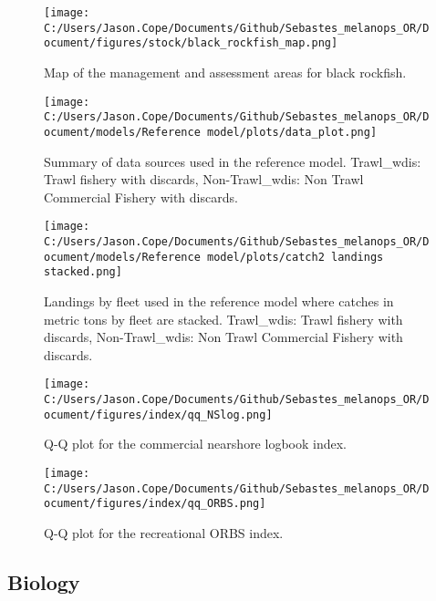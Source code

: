 \documentclass[11pt,
  english,
  letterpaper,
]{article}
\begin{document}
\begin{figure}
\centering
\texttt{[image: C:/Users/Jason.Cope/Documents/Github/Sebastes\_melanops\_OR/Document/figures/stock/black\_rockfish\_map.png]}
\caption{Map of the management and assessment areas for black rockfish.\label{fig:map}}
\end{figure}

\newpage

\begin{figure}
\centering
\texttt{[image: C:/Users/Jason.Cope/Documents/Github/Sebastes\_melanops\_OR/Document/models/Reference model/plots/data\_plot.png]}
\caption{Summary of data sources used in the reference model. Trawl\_wdis: Trawl fishery with discards, Non-Trawl\_wdis: Non Trawl Commercial Fishery with discards.\label{fig:data-plot}}
\end{figure}

\newpage

\begin{figure}
\centering
\texttt{[image: C:/Users/Jason.Cope/Documents/Github/Sebastes\_melanops\_OR/Document/models/Reference model/plots/catch2 landings stacked.png]}
\caption{Landings by fleet used in the reference model where catches in metric tons by fleet are stacked. Trawl\_wdis: Trawl fishery with discards, Non-Trawl\_wdis: Non Trawl Commercial Fishery with discards.\label{fig:catch}}
\end{figure}

\newpage

\begin{figure}
\centering
\texttt{[image: C:/Users/Jason.Cope/Documents/Github/Sebastes\_melanops\_OR/Document/figures/index/qq\_NSlog.png]}
\caption{Q-Q plot for the commercial nearshore logbook index.\label{fig:qq_NSlog}}
\end{figure}

\newpage

\begin{figure}
\centering
\texttt{[image: C:/Users/Jason.Cope/Documents/Github/Sebastes\_melanops\_OR/Document/figures/index/qq\_ORBS.png]}
\caption{Q-Q plot for the recreational ORBS index.\label{fig:qq_ORBS}}
\end{figure}

\newpage

\hypertarget{biology}{%
\subsection{Biology}\label{biology}}
\end{document}
